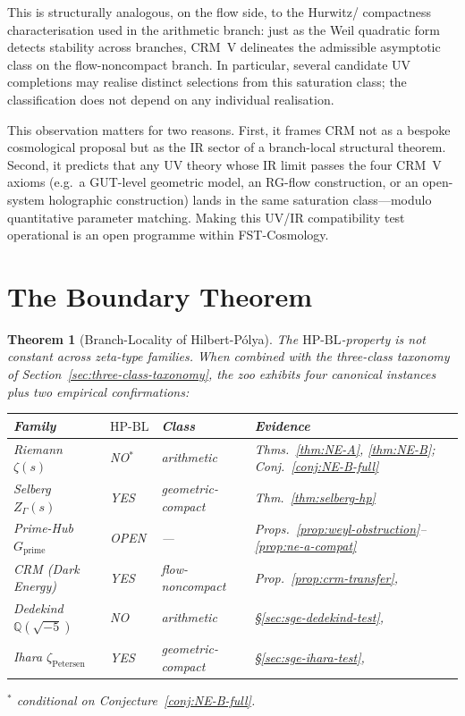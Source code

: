 \documentclass[11pt]{article}
\newtheorem{theorem}{Theorem}[section]
\theoremstyle{definition}
\theoremstyle{remark}
\newcommand{\HBL}{\mathrm{HP\text{-}BL}}
\begin{document}
This is structurally analogous, on the flow side, to the Hurwitz/
compactness characterisation used in the arithmetic branch: just as
the Weil quadratic form detects stability across branches, CRM~V
delineates the admissible asymptotic class on the flow-noncompact
branch. In particular, several candidate UV completions may
realise distinct selections from this saturation class; the
classification does not depend on any individual realisation.

This observation matters for two reasons. First, it frames CRM not
as a bespoke cosmological proposal but as the IR sector of a
branch-local structural theorem. Second, it predicts that any UV
theory whose IR limit passes the four CRM~V axioms (e.g.\ a
GUT-level geometric model, an RG-flow construction, or an
open-system holographic construction) lands in the same saturation
class---modulo quantitative parameter matching. Making this
UV/IR compatibility test operational is an open programme within
FST-Cosmology.

\section{The Boundary Theorem}
\label{sec:boundary}

\begin{theorem}[Branch-Locality of Hilbert-P\'olya]\label{thm:boundary}
The $\HBL$-property is not constant across zeta-type families. When
combined with the three-class taxonomy of
Section~\ref{sec:three-class-taxonomy}, the zoo exhibits four
canonical instances plus two empirical confirmations:

\begin{center}
\renewcommand{\arraystretch}{1.15}
\begin{tabular}{@{}llll@{}}
\toprule
Family & $\HBL$ & Class & Evidence \\
\midrule
Riemann $\zeta(s)$ & NO${}^*$ & arithmetic &
  Thms.~\ref{thm:NE-A}, \ref{thm:NE-B}; Conj.~\ref{conj:NE-B-full} \\
Selberg $Z_\Gamma(s)$ & YES & geometric-compact & Thm.~\ref{thm:selberg-hp} \\
Prime-Hub $G_\mathrm{prime}$ & OPEN & --- &
  Props.~\ref{prop:weyl-obstruction}--\ref{prop:ne-a-compat} \\
CRM (Dark Energy) & YES & flow-noncompact & Prop.~\ref{prop:crm-transfer}, \cite{DyatlovZworski2019} \\
Dedekind $\mathbb{Q}(\sqrt{-5})$ & NO & arithmetic & \S\ref{sec:sge-dedekind-test}, \cite{DedekindNEBTest} \\
Ihara $\zeta_{\text{Petersen}}$ & YES & geometric-compact & \S\ref{sec:sge-ihara-test}, \cite{IharaPetersenTest} \\
\bottomrule
\end{tabular}
\end{center}
${}^*$ conditional on Conjecture~\ref{conj:NE-B-full}.
\end{theorem}
\end{document}
